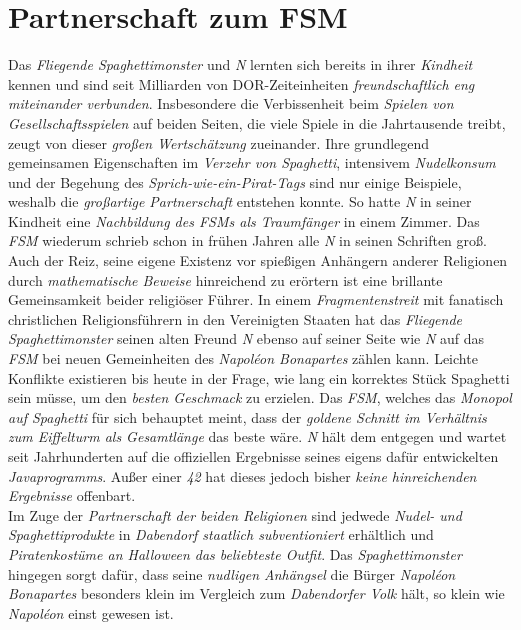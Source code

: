 \section{{Partnerschaft zum FSM}}\label{PartnerschaftFSM}
Das \textit{Fliegende Spaghettimonster} und \textit{N} lernten sich bereits in ihrer \textit{Kindheit} kennen und sind seit Milliarden von DOR-Zeiteinheiten \textit{freundschaftlich eng miteinander verbunden}. Insbesondere die Verbissenheit beim \textit{Spielen von Gesellschaftsspielen} auf beiden Seiten, die viele Spiele in die Jahrtausende treibt, zeugt von dieser \textit{großen Wertschätzung} zueinander. Ihre grundlegend gemeinsamen Eigenschaften im \textit{Verzehr von Spaghetti}, intensivem \textit{Nudelkonsum} und der Begehung des \textit{Sprich-wie-ein-Pirat-Tags} sind nur einige Beispiele, weshalb die \textit{großartige Partnerschaft} entstehen konnte. So hatte \textit{N} in seiner Kindheit eine \textit{Nachbildung des FSMs als Traumfänger} in einem Zimmer. Das \textit{FSM} wiederum schrieb schon in frühen Jahren alle \textit{N} in seinen Schriften groß. Auch der Reiz, seine eigene Existenz vor spießigen Anhängern anderer Religionen durch \textit{mathematische Beweise} hinreichend zu erörtern ist eine brillante Gemeinsamkeit beider religiöser Führer. In einem \textit{Fragmentenstreit} mit fanatisch christlichen Religionsführern in den Vereinigten Staaten hat das \textit{Fliegende Spaghettimonster} seinen alten Freund \textit{N} ebenso auf seiner Seite wie \textit{N} auf das \textit{FSM} bei neuen Gemeinheiten des \textit{Napoléon Bonapartes} zählen kann. Leichte Konflikte existieren bis heute in der Frage, wie lang ein korrektes Stück Spaghetti sein müsse, um den \textit{besten Geschmack} zu erzielen. Das \textit{FSM}, welches das \textit{Monopol auf Spaghetti} für sich behauptet meint, dass der \textit{goldene Schnitt im Verhältnis zum Eiffelturm als Gesamtlänge} das beste wäre. \textit{N} hält dem entgegen und wartet seit Jahrhunderten auf die offiziellen Ergebnisse seines eigens dafür entwickelten \textit{Javaprogramms}. Außer einer \textit{42} hat dieses jedoch bisher \textit{keine hinreichenden Ergebnisse} offenbart.\\
Im Zuge der \textit{Partnerschaft der beiden Religionen} sind jedwede \textit{Nudel- und Spaghettiprodukte} in \textit{Dabendorf staatlich subventioniert} erhältlich und \textit{Piratenkostüme an Halloween das beliebteste Outfit}. Das \textit{Spaghettimonster} hingegen sorgt dafür, dass seine \textit{nudligen Anhängsel} die Bürger \textit{Napoléon Bonapartes} besonders klein im Vergleich zum \textit{Dabendorfer Volk} hält, so klein wie \textit{Napoléon} einst gewesen ist.


